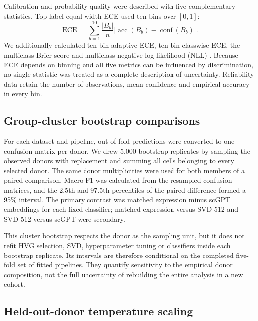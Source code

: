 Calibration and probability quality were described with five complementary statistics. Top-label equal-width ECE used ten bins over $[0,1]$:
\begin{equation}
\operatorname{ECE}=\sum_{b=1}^{10}\frac{|B_b|}{n}\left|\operatorname{acc}(B_b)-\operatorname{conf}(B_b)\right|.
\end{equation}
We additionally calculated ten-bin adaptive ECE, ten-bin classwise ECE, the multiclass Brier score and multiclass negative log-likelihood (NLL) \citep{Brier1950,Gneiting2007,Vaicenavicius2019}. Because ECE depends on binning and all five metrics can be influenced by discrimination, no single statistic was treated as a complete description of uncertainty. Reliability data retain the number of observations, mean confidence and empirical accuracy in every bin.

\subsection{Group-cluster bootstrap comparisons}

For each dataset and pipeline, out-of-fold predictions were converted to one confusion matrix per donor. We drew 5,000 bootstrap replicates by sampling the observed donors with replacement and summing all cells belonging to every selected donor. The same donor multiplicities were used for both members of a paired comparison. Macro F1 was calculated from the resampled confusion matrices, and the 2.5th and 97.5th percentiles of the paired difference formed a 95\% interval. The primary contrast was matched expression minus scGPT embeddings for each fixed classifier; matched expression versus SVD-512 and SVD-512 versus scGPT were secondary.

This cluster bootstrap respects the donor as the sampling unit, but it does not refit HVG selection, SVD, hyperparameter tuning or classifiers inside each bootstrap replicate. Its intervals are therefore conditional on the completed five-fold set of fitted pipelines. They quantify sensitivity to the empirical donor composition, not the full uncertainty of rebuilding the entire analysis in a new cohort.

\subsection{Held-out-donor temperature scaling}

